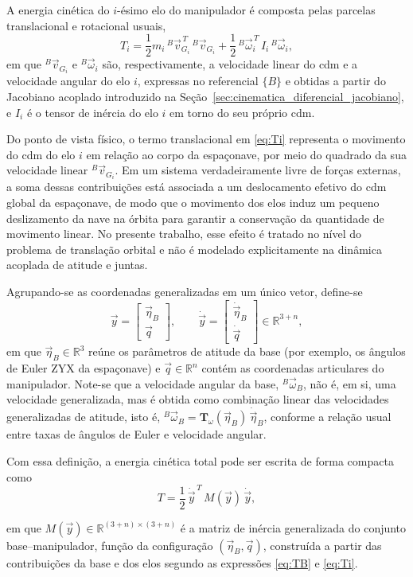 A energia cinética do $i$-ésimo elo do manipulador é composta pelas parcelas
translacional e rotacional usuais,
\begin{equation}
T_i =
\frac{1}{2} m_i\, {}^{B}\!\vec v_{G_i}^{\,T}\,{}^{B}\!\vec v_{G_i}
+
\frac{1}{2}\, {}^{B}\!\vec\omega_i^{\,T}\, I_i\, {}^{B}\!\vec\omega_i,
\label{eq:Ti}
\end{equation}
em que ${}^{B}\!\vec v_{G_i}$ e ${}^{B}\!\vec\omega_i$ são, respectivamente, a
velocidade linear do \gls{cdm} e a velocidade angular do elo $i$,
expressas no referencial $\{B\}$ e obtidas a partir do Jacobiano acoplado
introduzido na Seção~\ref{sec:cinematica_diferencial_jacobiano}, e $I_i$ é o
tensor de inércia do elo $i$ em torno do seu próprio \gls{cdm}.

Do ponto de vista físico, o termo translacional em \eqref{eq:Ti} representa o movimento do \gls{cdm} do elo $i$ em relação ao corpo da espaçonave, por meio do quadrado da sua velocidade linear ${}^{B}\!\vec v_{G_i}$.
Em um sistema verdadeiramente livre de forças externas, a soma dessas contribuições está
associada a um deslocamento efetivo do \gls{cdm} global da espaçonave, de modo que o movimento dos elos induz um pequeno deslizamento da nave na órbita para garantir a conservação da quantidade de movimento linear.
No presente trabalho, esse efeito é tratado no nível do problema de translação orbital e não é modelado explicitamente na dinâmica acoplada de atitude e juntas.


Agrupando-se as coordenadas generalizadas em um único vetor, define-se
\begin{equation}
\vec y
=
\begin{bmatrix}
\vec\eta_B \\
\vec q
\end{bmatrix},
\qquad
\dot{\vec y}
=
\begin{bmatrix}
\dot{\vec\eta}_B \\
\dot{\vec q}
\end{bmatrix}
\in \mathbb{R}^{3+n},
\label{eq:veloc_generalizadas}
\end{equation}
em que $\vec\eta_B \in \mathbb{R}^3$ reúne os parâmetros de atitude da base
(por exemplo, os ângulos de Euler ZYX da espaçonave) e $\vec q \in \mathbb{R}^n$
contém as coordenadas articulares do manipulador. Note-se que a velocidade
angular da base, ${}^{B}\!\vec\omega_B$, não é, em si, uma velocidade
generalizada, mas é obtida como combinação linear das velocidades
generalizadas de atitude, isto é,
${}^{B}\!\vec\omega_B = \mathbf{T}_\omega(\vec\eta_B)\,\dot{\vec\eta}_B$,
conforme a relação usual entre taxas de ângulos de Euler e velocidade angular.

Com essa definição, a energia cinética total pode ser escrita de forma compacta como
\begin{equation}
T =
\frac{1}{2}\,\dot{\vec y}^{\,T}\,
M(\vec y)\,
\dot{\vec y},
\label{eq:T_quadratica_Mq}
\end{equation}

em que $M(\vec y)\in\mathbb{R}^{(3+n)\times(3+n)}$ é a matriz de inércia
generalizada do conjunto base--manipulador, função da configuração
$(\vec\eta_B,\vec q)$, construída a partir das contribuições da base e dos
elos segundo as expressões \eqref{eq:TB} e \eqref{eq:Ti}.